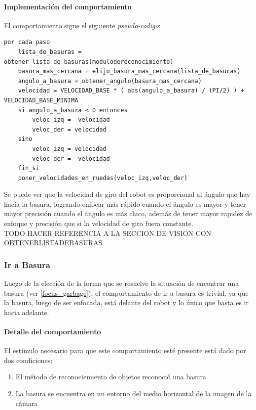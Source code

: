 \paragraph{Implementaci\'on del comportamiento}
El comportamiento sigue el siguiente \emph{pseudo-codigo}:
\begin{verbatim}
por cada paso
    lista_de_basuras = obtener_lista_de_basuras(modulodereconocimiento)
    basura_mas_cercana = elijo_basura_mas_cercana(lista_de_basuras)
    angulo_a_basura = obtener_angulo(basura_mas_cercana)
    velocidad = VELOCIDAD_BASE * ( abs(angulo_a_basura) / (PI/2) ) + VELOCIDAD_BASE_MINIMA
    si angulo_a_basura < 0 entonces
        veloc_izq = -velocidad
        veloc_der = velocidad
    sino
        veloc_izq = velocidad
        veloc_der = -velocidad
    fin_si
    poner_velocidades_en_ruedas(veloc_izq,veloc_der)
\end{verbatim}

Se puede ver que la velocidad de giro del robot es proporcional al \'angulo que hay
hacia la basura, logrando enfocar m\'as r\'apido cuando el \'angulo es mayor y tener
mayor precisi\'on cuando el \'angulo es m\'as chico, adem\'as de tener mayor rapidez
de enfoque y precisi\'on que si la velocidad de giro fuera constante.
\\
TODO HACER REFERENCIA A LA SECCION DE VISION CON OBTENERLISTADEBASURAS

\subsubsection{Ir a Basura}
\label{go_to_garbage}
Luego de la elecci\'on de la forma que se resuelve la situaci\'on de encontrar una
basura (ver \ref{focus_garbage}), el comportamiento de ir a basura es trivial, ya
que la basura, luego de ser enfocada, est\'a delante del robot y lo \'unico que
basta es ir hacia adelante.

\paragraph{Detalle del comportamiento}
El est\'imulo necesario para que este comportamiento est\'e presente est\'a
dado por dos condiciones:
\begin{enumerate}
\item El m\'etodo de reconociemiento de objetos reconoci\'o una basura
\item La basura se encuentra en un entorno del medio horizontal de la imagen de la c\'amara
\end{enumerate}
